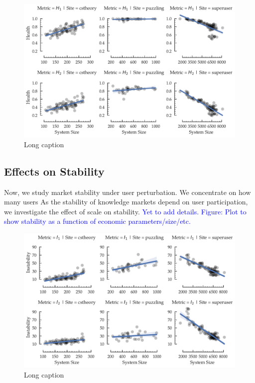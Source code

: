 \begin{figure}[hbt]
\centering
\includegraphics[scale=0.38]{Figures/Size_vs_Health.pdf}
\caption{Long caption}
\label{fig:health}
\end{figure}

\subsection{Effects on Stability}
Now, we study market stability under user perturbation. We concentrate on how many users
As the stability of knowledge markets depend on user participation, we investigate the effect of scale on stability. \textcolor{blue}{Yet to add details. Figure: Plot to show stability as a function of economic parameters/size/etc.}

\begin{figure}[hbt]
\centering
\includegraphics[scale=0.38]{Figures/Size_vs_Instability.pdf}
\caption{Long caption}
\label{fig:stability}
\end{figure}



